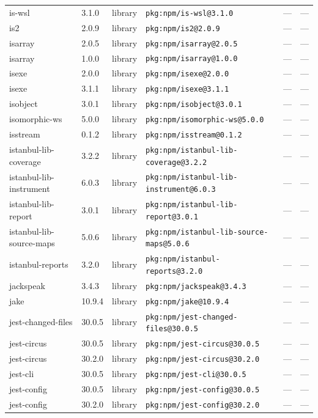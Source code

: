 \documentclass[11pt]{article}
\begin{document}
\begin{longtable}{|l|l|l|p{2.2cm}|l|p{4cm}|}
is-wsl & 3.1.0 & library & \texttt{pkg:npm/is-wsl@3.1.0} & — & — \\
is2 & 2.0.9 & library & \texttt{pkg:npm/is2@2.0.9} & — & — \\
isarray & 2.0.5 & library & \texttt{pkg:npm/isarray@2.0.5} & — & — \\
isarray & 1.0.0 & library & \texttt{pkg:npm/isarray@1.0.0} & — & — \\
isexe & 2.0.0 & library & \texttt{pkg:npm/isexe@2.0.0} & — & — \\
isexe & 3.1.1 & library & \texttt{pkg:npm/isexe@3.1.1} & — & — \\
isobject & 3.0.1 & library & \texttt{pkg:npm/isobject@3.0.1} & — & — \\
isomorphic-ws & 5.0.0 & library & \texttt{pkg:npm/isomorphic-ws@5.0.0} & — & — \\
isstream & 0.1.2 & library & \texttt{pkg:npm/isstream@0.1.2} & — & — \\
istanbul-lib-coverage & 3.2.2 & library & \texttt{pkg:npm/istanbul-lib-coverage@3.2.2} & — & — \\
istanbul-lib-instrument & 6.0.3 & library & \texttt{pkg:npm/istanbul-lib-instrument@6.0.3} & — & — \\
istanbul-lib-report & 3.0.1 & library & \texttt{pkg:npm/istanbul-lib-report@3.0.1} & — & — \\
istanbul-lib-source-maps & 5.0.6 & library & \texttt{pkg:npm/istanbul-lib-source-maps@5.0.6} & — & — \\
istanbul-reports & 3.2.0 & library & \texttt{pkg:npm/istanbul-reports@3.2.0} & — & — \\
jackspeak & 3.4.3 & library & \texttt{pkg:npm/jackspeak@3.4.3} & — & — \\
jake & 10.9.4 & library & \texttt{pkg:npm/jake@10.9.4} & — & — \\
jest-changed-files & 30.0.5 & library & \texttt{pkg:npm/jest-changed-files@30.0.5} & — & — \\
jest-circus & 30.0.5 & library & \texttt{pkg:npm/jest-circus@30.0.5} & — & — \\
jest-circus & 30.2.0 & library & \texttt{pkg:npm/jest-circus@30.2.0} & — & — \\
jest-cli & 30.0.5 & library & \texttt{pkg:npm/jest-cli@30.0.5} & — & — \\
jest-config & 30.0.5 & library & \texttt{pkg:npm/jest-config@30.0.5} & — & — \\
jest-config & 30.2.0 & library & \texttt{pkg:npm/jest-config@30.2.0} & — & — \\

\end{longtable}
\end{document}
